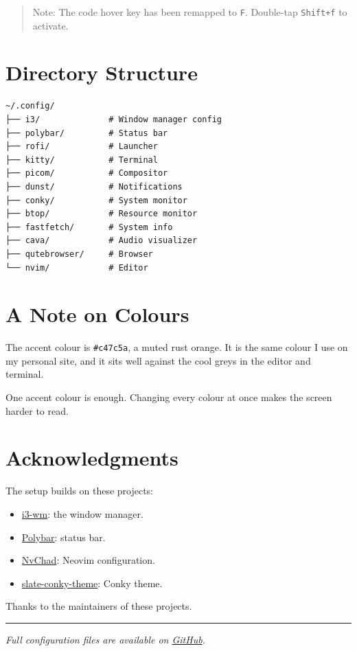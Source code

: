 \begin{quote}
Note: The code hover key has been remapped to \verb|F|. Double-tap \verb|Shift+f| to activate.
\end{quote}

\section{Directory Structure}

\begin{verbatim}
~/.config/
├── i3/              # Window manager config
├── polybar/         # Status bar
├── rofi/            # Launcher
├── kitty/           # Terminal
├── picom/           # Compositor
├── dunst/           # Notifications
├── conky/           # System monitor
├── btop/            # Resource monitor
├── fastfetch/       # System info
├── cava/            # Audio visualizer
├── qutebrowser/     # Browser
└── nvim/            # Editor
\end{verbatim}

\section{A Note on Colours}

The accent colour is \verb|#c47c5a|, a muted rust orange. It is the same colour I use on my personal site, and it sits well against the cool greys in the editor and terminal.

One accent colour is enough. Changing every colour at once makes the screen harder to read.

\section{Acknowledgments}

The setup builds on these projects:

\begin{itemize}
  \item \href{https://i3wm.org/}{i3-wm}: the window manager.
  \item \href{https://github.com/polybar/polybar}{Polybar}: status bar.
  \item \href{https://github.com/NvChad/NvChad}{NvChad}: Neovim configuration.
  \item \href{https://github.com/slate-conky-theme}{slate-conky-theme}: Conky theme.
\end{itemize}

Thanks to the maintainers of these projects.

\hrule

\emph{Full configuration files are available on \href{https://github.com/mejistus/fantastic-i3}{GitHub}.}
